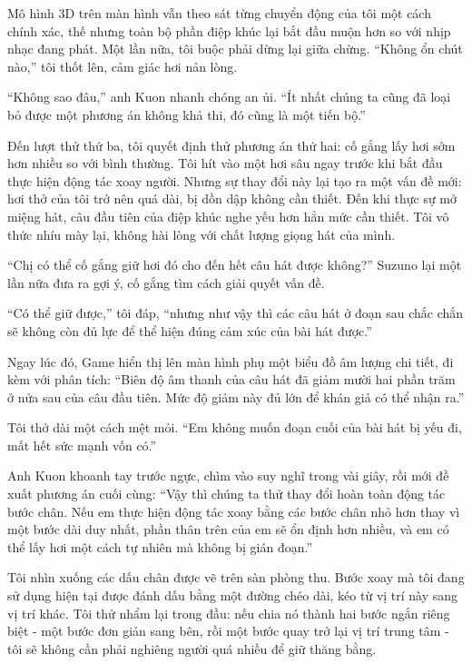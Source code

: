 ﻿\documentclass[../main.tex]{subfiles}
\begin{document}
Mô hình 3D trên màn hình vẫn theo sát từng chuyển động của tôi một cách chính xác, thế nhưng toàn bộ phần điệp khúc lại bắt đầu muộn hơn so với nhịp nhạc đang phát. Một lần nữa, tôi buộc phải dừng lại giữa chừng. ``Không ổn chút nào,'' tôi thốt lên, cảm giác hơi nản lòng.

``Không sao đâu,'' anh Kuon nhanh chóng an ủi. ``Ít nhất chúng ta cũng đã loại bỏ được một phương án không khả thi, đó cũng là một tiến bộ.''

Đến lượt thử thứ ba, tôi quyết định thử phương án thứ hai: cố gắng lấy hơi sớm hơn nhiều so với bình thường. Tôi hít vào một hơi sâu ngay trước khi bắt đầu thực hiện động tác xoay người. Nhưng sự thay đổi này lại tạo ra một vấn đề mới: hơi thở của tôi trở nên quá dài, bị dồn dập không cần thiết. Đến khi thực sự mở miệng hát, câu đầu tiên của điệp khúc nghe yếu hơn hẳn mức cần thiết. Tôi vô thức nhíu mày lại, không hài lòng với chất lượng giọng hát của mình.

``Chị có thể cố gắng giữ hơi đó cho đến hết câu hát được không?'' Suzuno lại một lần nữa đưa ra gợi ý, cố gắng tìm cách giải quyết vấn đề.

``Có thể giữ được,'' tôi đáp, ``nhưng như vậy thì các câu hát ở đoạn sau chắc chắn sẽ không còn đủ lực để thể hiện đúng cảm xúc của bài hát được.''

Ngay lúc đó, Game hiển thị lên màn hình phụ một biểu đồ âm lượng chi tiết, đi kèm với phân tích: ``Biên độ âm thanh của câu hát đã giảm mười hai phần trăm ở nửa sau của câu đầu tiên. Mức độ giảm này đủ lớn để khán giả có thể nhận ra.''

Tôi thở dài một cách mệt mỏi. ``Em không muốn đoạn cuối của bài hát bị yếu đi, mất hết sức mạnh vốn có.''

Anh Kuon khoanh tay trước ngực, chìm vào suy nghĩ trong vài giây, rồi mới đề xuất phương án cuối cùng: ``Vậy thì chúng ta thử thay đổi hoàn toàn động tác bước chân. Nếu em thực hiện động tác xoay bằng các bước chân nhỏ hơn thay vì một bước dài duy nhất, phần thân trên của em sẽ ổn định hơn nhiều, và em có thể lấy hơi một cách tự nhiên mà không bị gián đoạn.''

Tôi nhìn xuống các dấu chân được vẽ trên sàn phòng thu. Bước xoay mà tôi đang sử dụng hiện tại được đánh dấu bằng một đường chéo dài, kéo từ vị trí này sang vị trí khác. Tôi thử nhẩm lại trong đầu: nếu chia nó thành hai bước ngắn riêng biệt - một bước đơn giản sang bên, rồi một bước quay trở lại vị trí trung tâm - tôi sẽ không cần phải nghiêng người quá nhiều để giữ thăng bằng.
\end{document}
